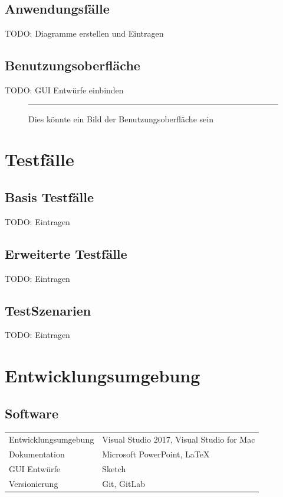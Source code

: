 \documentclass[a4paper]{scrreprt}
\begin{document}
\section{Anwendungsfälle}
TODO: Diagramme erstellen und Eintragen
\section{Benutzungsoberfläche}
TODO: GUI Entwürfe  einbinden
\begin{figure}[ht]
  \centering
  \rule{8cm}{6cm}
  \caption{Dies könnte ein Bild der Benutzungsoberfläche sein}
\end{figure}

\chapter{Testfälle}
\section{Basis Testfälle}
TODO: Eintragen
\section{Erweiterte Testfälle}
TODO: Eintragen
\section{TestSzenarien}
TODO: Eintragen
 

\chapter{Entwicklungsumgebung}
 
\section{Software}
\begin{tabular}{lll}
Entwicklungsumgebung &  \multicolumn{2}{p{12cm}}{Visual Studio 2017, Visual Studio for Mac}\\
Dokumentation &  \multicolumn{2}{p{12cm}}{Microsoft PowerPoint, LaTeX}  \\
GUI Entwürfe & \multicolumn{2}{p{12cm}}{Sketch} \\
Versionierung & \multicolumn{2}{p{12cm}}{Git, GitLab} \\
\end{tabular}

 
\end{document}

